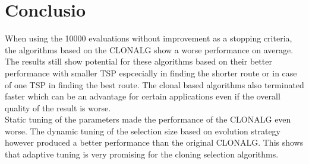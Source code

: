\chapter{Conclusio}
\label{chap:con}
When using the 10000 evaluations without improvement as a stopping criteria, the algorithms based on the CLONALG show a worse performance on average. The results still show potential for these algorithms based on their better performance with smaller TSP espcecially in finding the shorter route or in case of one TSP in finding the best route. The clonal based algorithms also terminated faster which can be an advantage for certain applications even if the overall quality of the result is worse.\\
Static tuning of the parameters made the performance of the CLONALG even worse. The dynamic tuning of the selection size based on evolution strategy however produced a better performance than the original CLONALG. This shows that adaptive tuning is very promising for the cloning selection algorithms.